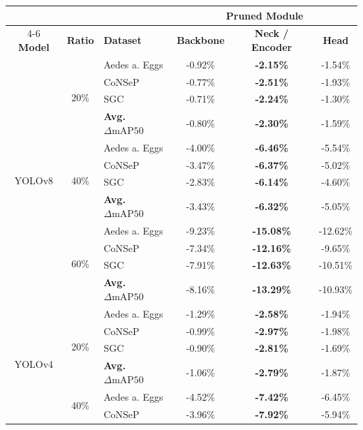 \centering
\label{tab:all_models_dataset_rows_a}
\small
\begin{tabular}{cclccc}
\toprule
& & & \multicolumn{3}{c}{\textbf{Pruned Module}} \\
\cmidrule(lr){4-6}
\textbf{Model} & \textbf{Ratio} & \textbf{Dataset} & \textbf{Backbone} & \textbf{Neck / Encoder} & \textbf{Head} \\
\midrule
\multirow{12}{*}{YOLOv8} 
& \multirow{4}{*}{20\%} 
& Aedes a. Eggs & -0.92\% & \textbf{-2.15\%} & -1.54\% \\
& & CoNSeP        & -0.77\% & \textbf{-2.51\%} & -1.93\% \\
& & SGC           & -0.71\% & \textbf{-2.24\%} & -1.30\% \\
\cmidrule(lr){3-6}
& & \textbf{Avg. $\Delta\text{mAP50}$} & -0.80\% & \textbf{-2.30\%} & -1.59\% \\
\cmidrule(lr){2-6}
& \multirow{4}{*}{40\%} 
& Aedes a. Eggs & -4.00\% & \textbf{-6.46\%} & -5.54\% \\
& & CoNSeP        & -3.47\% & \textbf{-6.37\%} & -5.02\% \\
& & SGC           & -2.83\% & \textbf{-6.14\%} & -4.60\% \\
\cmidrule(lr){3-6}
& & \textbf{Avg. $\Delta\text{mAP50}$} & -3.43\% & \textbf{-6.32\%} & -5.05\% \\
\cmidrule(lr){2-6}
& \multirow{4}{*}{60\%} 
& Aedes a. Eggs & -9.23\% & \textbf{-15.08\%} & -12.62\% \\
& & CoNSeP        & -7.34\% & \textbf{-12.16\%} & -9.65\% \\
& & SGC           & -7.91\% & \textbf{-12.63\%} & -10.51\% \\
\cmidrule(lr){3-6}
& & \textbf{Avg. $\Delta\text{mAP50}$} & -8.16\% & \textbf{-13.29\%} & -10.93\% \\
\midrule
\multirow{12}{*}{YOLOv4} 
& \multirow{4}{*}{20\%} 
& Aedes a. Eggs & -1.29\% & \textbf{-2.58\%} & -1.94\% \\
& & CoNSeP        & -0.99\% & \textbf{-2.97\%} & -1.98\% \\
& & SGC           & -0.90\% & \textbf{-2.81\%} & -1.69\% \\
\cmidrule(lr){3-6}
& & \textbf{Avg. $\Delta\text{mAP50}$} & -1.06\% & \textbf{-2.79\%} & -1.87\% \\
\cmidrule(lr){2-6}
& \multirow{4}{*}{40\%} 
& Aedes a. Eggs & -4.52\% & \textbf{-7.42\%} & -6.45\% \\
& & CoNSeP        & -3.96\% & \textbf{-7.92\%} & -5.94\% \\

\end{tabular}
